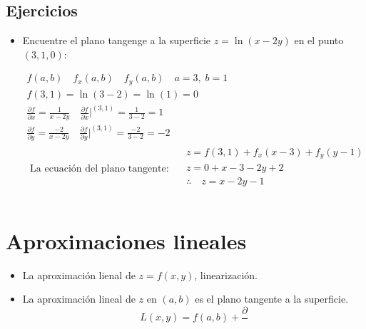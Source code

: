 \subsection{Ejercicios}
\begin{itemize}
    \item Encuentre el plano tangenge a la superficie $z=\ln(x-2y)$ en el punto $(3,1,0)$:
        \begin{center}
           \begin{align*}
               f(a,b) \quad f_x(a,b) \quad f_y(a,b) \quad a=3,\; b=1 \\ 
               f(3,1) = \ln(3-2) = \ln(1) = 0 \\ 
               \frac{\partial f}{\partial x } = \frac{1}{x-2y}  \quad \frac{\partial f}{\partial x } \Big|_{}^{(3,1)} = \frac{1}{3-2} = 1 \\ 
               \frac{\partial f}{\partial y } = \frac{-2}{x-2y} \quad \frac{\partial f}{\partial y } \Big|_{}^{(3,1)} = \frac{-2}{3-2} = -2 \\ 
               \text{  La ecuación del plano tangente:  } \quad \begin{matrix}
                    z = f(3,1)+f_x(x-3)+f_y(y-1) \\ 
                    z = 0 + x-3-2y+2 \\ 
                    \therefore \quad  z = x-2y-1 \\ 
               \end{matrix} \\ 
           \end{align*}
        \end{center}
\end{itemize}


\section{Aproximaciones lineales}
\begin{itemize}
    \item La aproximación lienal de $z=f(x,y)$, linearización.
    \item La aproximación lineal de $z$ en $(a,b)$ es el plano tangente a la superficie.
        \[
          L(x,y)= f(a,b) + \frac{\partial }{} 
        \]
\end{itemize}


